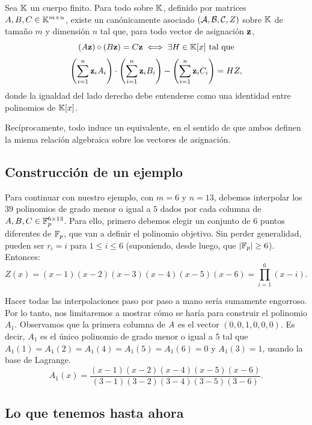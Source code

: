 \begin{theorem}
	Sea $\mathbb{K}$ un cuerpo finito. Para todo \ROneCS sobre $\mathbb{K}$, definido por matrices $A, B, C \in \mathbb{K}^{m \times n}$, existe un \QAP canónicamente asociado $(\mathcal{A}, \mathcal{B}, \mathcal{C}, Z)$ sobre $\mathbb{K}$ de tamaño $m$ y dimensión $n$ tal que, para todo vector de asignación $\mathbf{z}$,
	$$(A\mathbf{z}) \circ (B\mathbf{z}) = C\mathbf{z} \iff \exists H \in \mathbb{K}[x]\ \textnormal{tal que}$$
	$$\left(\sum_{i=1}^{n} \mathbf{z}_i A_i\right) \cdot \left(\sum_{i=1}^{n} \mathbf{z}_i B_i\right) - \left(\sum_{i=1}^{n} \mathbf{z}_i C_i\right) = HZ,$$
	donde la igualdad del lado derecho debe entenderse como una identidad entre polinomios de $\mathbb{K}[x]$.
	
	Recíprocamente, todo \QAP induce un \ROneCS equivalente, en el sentido de que ambos definen la misma relación algebraica sobre los vectores de asignación.
\end{theorem}

\subsection{Construcción de un ejemplo}
\label{subsec:apendice-b-qap-construccion-de-un-ejemplo}

Para continuar con nuestro ejemplo, con $m = 6$ y $n = 13$, debemos interpolar los $39$ polinomios de grado menor o igual a $5$ dados por cada columna de $A,B,C \in \mathbb{F}_p^{6 \times 13}$. Para ello, primero debemos elegir un conjunto de $6$ puntos diferentes de $\mathbb{F}_p$, que van a definir el polinomio objetivo. Sin perder generalidad, pueden ser $r_i = i$ para $1 \leq i \leq 6$ (suponiendo, desde luego, que $|\mathbb{F}_p| \geq 6$). Entonces:
$$Z(x) = (x - 1)(x - 2)(x - 3)(x - 4)(x - 5)(x - 6) = \prod_{i=1}^{6} (x - i).$$

Hacer todas las interpolaciones paso por paso a mano sería sumamente engorroso. Por lo tanto, nos limitaremos a mostrar cómo se haría para construir el polinomio $A_1$. Observamos que la primera columna de $A$ es el vector $(0, 0, 1, 0, 0, 0)$. Es decir, $A_1$ es el único polinomio de grado menor o igual a $5$ tal que $A_1(1) = A_1(2) = A_1(4) = A_1(5) = A_1(6) = 0$ y $A_1(3) = 1$, usando la base de Lagrange.
$$A_1(x) = \frac{(x - 1)(x - 2)(x - 4)(x - 5)(x - 6)}{(3 - 1)(3 - 2)(3 - 4)(3 - 5)(3 - 6)}.$$

\subsection{Lo que tenemos hasta ahora}
\label{subsec:apendice-b-qap-lo-que-tenemos-hasta-ahora}

